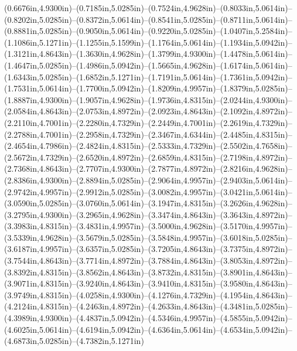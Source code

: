 (0.6676in,4.9300in)--(0.7185in,5.0285in)--(0.7524in,4.9628in)--(0.8033in,5.0614in)--(0.8202in,5.0285in)--(0.8372in,5.0614in)--(0.8541in,5.0285in)--(0.8711in,5.0614in)--(0.8881in,5.0285in)--(0.9050in,5.0614in)--(0.9220in,5.0285in)--(1.0407in,5.2584in)--(1.1086in,5.1271in)--(1.1255in,5.1599in)--(1.1764in,5.0614in)--(1.1934in,5.0942in)--(1.3121in,4.8643in)--(1.3630in,4.9628in)--(1.3799in,4.9300in)--(1.4478in,5.0614in)--(1.4647in,5.0285in)--(1.4986in,5.0942in)--(1.5665in,4.9628in)--(1.6174in,5.0614in)--(1.6343in,5.0285in)--(1.6852in,5.1271in)--(1.7191in,5.0614in)--(1.7361in,5.0942in)--(1.7531in,5.0614in)--(1.7700in,5.0942in)--(1.8209in,4.9957in)--(1.8379in,5.0285in)--(1.8887in,4.9300in)--(1.9057in,4.9628in)--(1.9736in,4.8315in)--(2.0244in,4.9300in)--(2.0584in,4.8643in)--(2.0753in,4.8972in)--(2.0923in,4.8643in)--(2.1092in,4.8972in)--(2.2110in,4.7001in)--(2.2280in,4.7329in)--(2.2449in,4.7001in)--(2.2619in,4.7329in)--(2.2788in,4.7001in)--(2.2958in,4.7329in)--(2.3467in,4.6344in)--(2.4485in,4.8315in)--(2.4654in,4.7986in)--(2.4824in,4.8315in)--(2.5333in,4.7329in)--(2.5502in,4.7658in)--(2.5672in,4.7329in)--(2.6520in,4.8972in)--(2.6859in,4.8315in)--(2.7198in,4.8972in)--(2.7368in,4.8643in)--(2.7707in,4.9300in)--(2.7877in,4.8972in)--(2.8216in,4.9628in)--(2.8386in,4.9300in)--(2.8894in,5.0285in)--(2.9064in,4.9957in)--(2.9403in,5.0614in)--(2.9742in,4.9957in)--(2.9912in,5.0285in)--(3.0082in,4.9957in)--(3.0421in,5.0614in)--(3.0590in,5.0285in)--(3.0760in,5.0614in)--(3.1947in,4.8315in)--(3.2626in,4.9628in)--(3.2795in,4.9300in)--(3.2965in,4.9628in)--(3.3474in,4.8643in)--(3.3643in,4.8972in)--(3.3983in,4.8315in)--(3.4831in,4.9957in)--(3.5000in,4.9628in)--(3.5170in,4.9957in)--(3.5339in,4.9628in)--(3.5679in,5.0285in)--(3.5848in,4.9957in)--(3.6018in,5.0285in)--(3.6187in,4.9957in)--(3.6357in,5.0285in)--(3.7205in,4.8643in)--(3.7375in,4.8972in)--(3.7544in,4.8643in)--(3.7714in,4.8972in)--(3.7884in,4.8643in)--(3.8053in,4.8972in)--(3.8392in,4.8315in)--(3.8562in,4.8643in)--(3.8732in,4.8315in)--(3.8901in,4.8643in)--(3.9071in,4.8315in)--(3.9240in,4.8643in)--(3.9410in,4.8315in)--(3.9580in,4.8643in)--(3.9749in,4.8315in)--(4.0258in,4.9300in)--(4.1276in,4.7329in)--(4.1954in,4.8643in)--(4.2124in,4.8315in)--(4.2463in,4.8972in)--(4.2633in,4.8643in)--(4.3481in,5.0285in)--(4.3989in,4.9300in)--(4.4837in,5.0942in)--(4.5346in,4.9957in)--(4.5855in,5.0942in)--(4.6025in,5.0614in)--(4.6194in,5.0942in)--(4.6364in,5.0614in)--(4.6534in,5.0942in)--(4.6873in,5.0285in)--(4.7382in,5.1271in) 